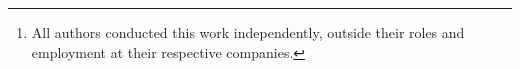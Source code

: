 \author{
    Kapil Wanaskar\textsuperscript{\rm 1}\thanks{All authors conducted this work independently, outside their roles and employment at their respective companies.},
    Gaytri Jena\textsuperscript{\rm 2},
    Vini{}ja Jain\textsuperscript{\rm 3},  %
    Aman Chadha\textsuperscript{\rm 4},
    Amitava Das\textsuperscript{\rm 5}
}
